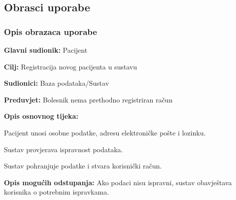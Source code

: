 			\eject 
			
			
				
			\subsection{Obrasci uporabe}
				
				
				\subsubsection{Opis obrazaca uporabe}
					

					\noindent {}
					\begin{packed_item}
	
						\item \textbf{Glavni sudionik: }Pacijent
						\item  \textbf{Cilj:} Registracija novog pacijenta u sustavu
						\item  \textbf{Sudionici:} Baza podataka/Sustav
						\item  \textbf{Preduvjet:} Bolesnik nema prethodno registriran račun
						\item  \textbf{Opis osnovnog tijeka:}
						
						\item[] \begin{packed_enum}
	
							\item Pacijent unosi osobne podatke, adresu elektroničke pošte i lozinku.
							\item Sustav provjerava ispravnost podataka.
							\item Sustav pohranjuje podatke i stvara korisnički račun.
	
						\end{packed_enum}
						
						\item  \textbf{Opis mogućih odstupanja:} Ako podaci nisu ispravni, sustav obavještava korisnika o potrebnim ispravkama.
						
						
					\end{packed_item}

